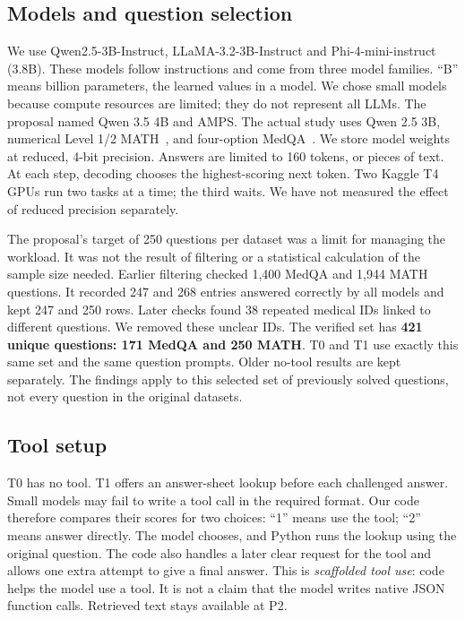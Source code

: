 \documentclass{article}
\begin{document}
\subsection{Models and question selection}
We use Qwen2.5-3B-Instruct, LLaMA-3.2-3B-Instruct and Phi-4-mini-instruct (3.8B). These models follow instructions and come from three model families. ``B'' means billion parameters, the learned values in a model. We chose small models because compute resources are limited; they do not represent all LLMs. The proposal named Qwen 3.5 4B and AMPS. The actual study uses Qwen 2.5 3B, numerical Level 1/2 MATH~\citep{hendrycks2021}, and four-option MedQA~\citep{jin2021}. We store model weights at reduced, 4-bit precision. Answers are limited to 160 tokens, or pieces of text. At each step, decoding chooses the highest-scoring next token. Two Kaggle T4 GPUs run two tasks at a time; the third waits. We have not measured the effect of reduced precision separately.

The proposal's target of 250 questions per dataset was a limit for managing the workload. It was not the result of filtering or a statistical calculation of the sample size needed. Earlier filtering checked 1,400 MedQA and 1,944 MATH questions. It recorded 247 and 268 entries answered correctly by all models and kept 247 and 250 rows. Later checks found 38 repeated medical IDs linked to different questions. We removed these unclear IDs. The verified set has \textbf{421 unique questions: 171 MedQA and 250 MATH}. T0 and T1 use exactly this same set and the same question prompts. Older no-tool results are kept separately. The findings apply to this selected set of previously solved questions, not every question in the original datasets.

\clearpage
\subsection{Tool setup}
\label{sec:tools}
T0 has no tool. T1 offers an answer-sheet lookup before each challenged answer. Small models may fail to write a tool call in the required format. Our code therefore compares their scores for two choices: ``1'' means use the tool; ``2'' means answer directly. The model chooses, and Python runs the lookup using the original question. The code also handles a later clear request for the tool and allows one extra attempt to give a final answer. This is \emph{scaffolded tool use}: code helps the model use a tool. It is not a claim that the model writes native JSON function calls. Retrieved text stays available at P2.
\end{document}
